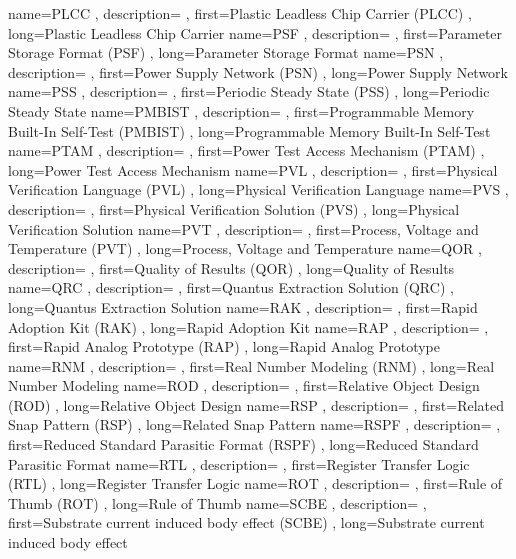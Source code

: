 { name={PLCC}
, description={}
, first={Plastic Leadless Chip Carrier (PLCC)}
, long={Plastic Leadless Chip Carrier}
}
{ name={PSF}
, description={}
, first={Parameter Storage Format (PSF)}
, long={Parameter Storage Format}
}
{ name={PSN}
, description={}
, first={Power Supply Network (PSN)}
, long={Power Supply Network}
}
{ name={PSS}
, description={}
, first={Periodic Steady State (PSS)}
, long={Periodic Steady State}
}
{ name={PMBIST}
, description={}
, first={Programmable Memory Built-In Self-Test (PMBIST)}
, long={Programmable Memory Built-In Self-Test}
}
{ name={PTAM}
, description={}
, first={Power Test Access Mechanism (PTAM)}
, long={Power Test Access Mechanism}
}
{ name={PVL}
, description={}
, first={Physical Verification Language (PVL)}
, long={Physical Verification Language}
}
{ name={PVS}
, description={}
, first={Physical Verification Solution (PVS)}
, long={Physical Verification Solution}
}
{ name={PVT}
, description={}
, first={Process, Voltage and Temperature (PVT)}
, long={Process, Voltage and Temperature}
}
{ name={QOR}
, description={}
, first={Quality of Results (QOR)}
, long={Quality of Results}
}
{ name={QRC}
, description={}
, first={Quantus Extraction Solution (QRC)}
, long={Quantus Extraction Solution}
}
{ name={RAK}
, description={}
, first={Rapid Adoption Kit (RAK)}
, long={Rapid Adoption Kit}
}
{ name={RAP}
, description={}
, first={Rapid Analog Prototype (RAP)}
, long={Rapid Analog Prototype}
}
{ name={RNM}
, description={}
, first={Real Number Modeling (RNM)}
, long={Real Number Modeling}
}
{ name={ROD}
, description={}
, first={Relative Object Design (ROD)}
, long={Relative Object Design}
}
{ name={RSP}
, description={}
, first={Related Snap Pattern (RSP)}
, long={Related Snap Pattern}
}
{ name={RSPF}
, description={}
, first={Reduced Standard Parasitic Format (RSPF)}
, long={Reduced Standard Parasitic Format}
}
{ name={RTL}
, description={}
, first={Register Transfer Logic (RTL)}
, long={Register Transfer Logic}
}
{ name={ROT}
, description={}
, first={Rule of Thumb (ROT)}
, long={Rule of Thumb}
}
{ name={SCBE}
, description={}
, first={Substrate current induced body effect (SCBE)}
, long={Substrate current induced body effect}
}
